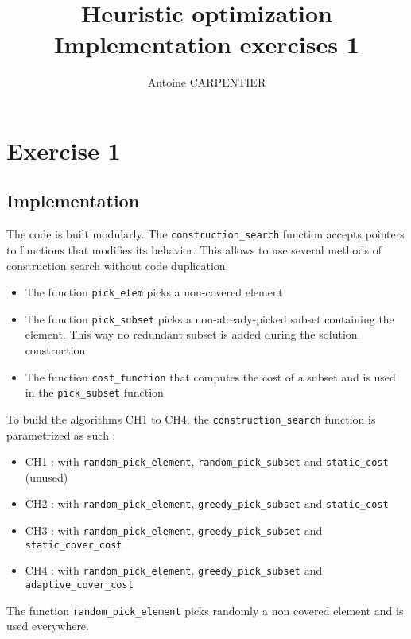 \documentclass[a4paper,12pt]{article}
\author{Antoine CARPENTIER}
\title{Heuristic optimization\\ \small Implementation exercises 1}
\begin{document}
\maketitle

\section{Exercise 1}

\subsection{Implementation}

The code is built modularly. The \texttt{construction\_search} function accepts pointers to functions that modifies its behavior. This allows to use several methods of construction search without code duplication.

\begin{itemize}
    \item The function \texttt{pick\_elem} picks a non-covered element
    \item The function \texttt{pick\_subset} picks a non-already-picked subset containing the element. This way no redundant subset is added during the solution construction
    \item The function \texttt{cost\_function} that computes the cost of a subset and is used in the \texttt{pick\_subset} function
\end{itemize}

To build the algorithms CH1 to CH4, the \texttt{construction\_search} function is parametrized as such : 

\begin{itemize}
    \item CH1 : with \texttt{random\_pick\_element}, \texttt{random\_pick\_subset} and \texttt{static\_cost} (unused)
    \item CH2 : with \texttt{random\_pick\_element}, \texttt{greedy\_pick\_subset} and \texttt{static\_cost}
    \item CH3 : with \texttt{random\_pick\_element}, \texttt{greedy\_pick\_subset} and \texttt{static\_cover\_cost}
    \item CH4 : with \texttt{random\_pick\_element}, \texttt{greedy\_pick\_subset} and \texttt{adaptive\_cover\_cost}
\end{itemize}

The function \texttt{random\_pick\_element} picks randomly a non covered element and is used everywhere.
\end{document}
